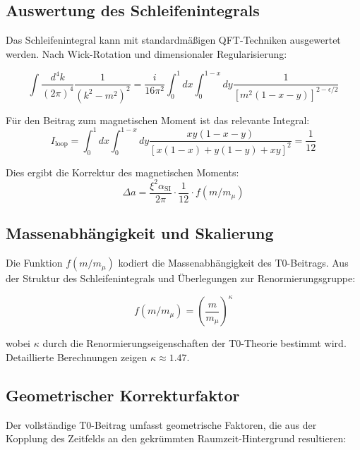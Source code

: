 \documentclass[12pt,a4paper]{article}
\newcommand{\xipar}{\xi}
\newcommand{\alphaSI}{\alpha_{\text{SI}}}
\newcommand{\kappaT}{\kappa}
\newcommand{\mmu}{m_{\mu}}
\begin{document}
	\subsection{Auswertung des Schleifenintegrals}
	
	Das Schleifenintegral kann mit standardmäßigen QFT-Techniken ausgewertet werden. Nach Wick-Rotation und dimensionaler Regularisierung:
	
	\begin{equation}
		\int \frac{d^4k}{(2\pi)^4} \frac{1}{(k^2 - m^2)^2} = \frac{i}{16\pi^2} \int_0^1 dx \int_0^{1-x} dy \frac{1}{[m^2(1-x-y)]^{2-\epsilon/2}}
	\end{equation}
	
	Für den Beitrag zum magnetischen Moment ist das relevante Integral:
	\begin{equation}
		I_{\text{loop}} = \int_0^1 dx \int_0^{1-x} dy \frac{xy(1-x-y)}{[x(1-x) + y(1-y) + xy]^2} = \frac{1}{12}
	\end{equation}
	
	Dies ergibt die Korrektur des magnetischen Moments:
	\begin{equation}
		\Delta a = \frac{\xipar^2 \alphaSI}{2\pi} \cdot \frac{1}{12} \cdot f(m/\mmu)
	\end{equation}
	
	\subsection{Massenabhängigkeit und Skalierung}
	
	Die Funktion $f(m/\mmu)$ kodiert die Massenabhängigkeit des T0-Beitrags. Aus der Struktur des Schleifenintegrals und Überlegungen zur Renormierungsgruppe:
	
	\begin{equation}
		f(m/\mmu) = \left(\frac{m}{\mmu}\right)^{\kappaT}
	\end{equation}
	
	wobei $\kappaT$ durch die Renormierungseigenschaften der T0-Theorie bestimmt wird. Detaillierte Berechnungen zeigen $\kappaT \approx 1.47$.
	
	\subsection{Geometrischer Korrekturfaktor}
	
	Der vollständige T0-Beitrag umfasst geometrische Faktoren, die aus der Kopplung des Zeitfelds an den gekrümmten Raumzeit-Hintergrund resultieren:
	
\end{document}
